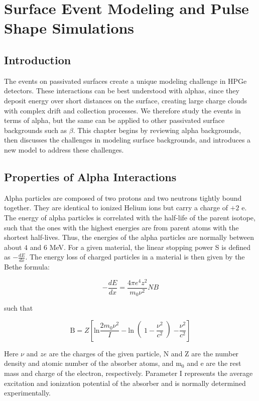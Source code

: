 \chapter{Surface Event Modeling and Pulse Shape Simulations}

\section{Introduction}

The events on passivated surfaces create a unique modeling challenge in HPGe detectors. These interactions can be best understood with alphas, since they deposit energy over short distances on the surface, creating large charge clouds with complex drift and collection processes. We therefore study the events in terms of alpha, but the same can be applied to other passivated surface backgrounds such as $\beta$. This chapter begins by reviewing alpha backgrounds, then discusses the challenges in modeling surface backgrounds, and introduces a new model to address these challenges.


\section{Properties of Alpha Interactions}
Alpha particles are composed of two protons and two neutrons tightly bound together. They are identical to ionized Helium ions but carry a charge of $+2$ e. The energy of alpha particles is correlated with the half-life of the parent isotope, such that the ones with the highest energies are from parent atoms with the shortest half-lives. Thus, the energies of the alpha particles are normally between about $4$ and $6$ MeV. For a given material, the linear stopping power S is defined as $-\frac{dE}{dx}$. The energy loss of charged particles in a material is then given by the Bethe formula:

\begin{equation}\label{bethe_formula}
    -\frac{dE}{dx} = \frac{4\pi e^4z^2}{m_0\nu^2}NB
\end{equation}

such that

\begin{equation}\label{bethe_B}
    \text{B}=Z\left[ \text{ln}\frac{2m_0\nu^2}{I}-\text{ln}\right(1-\frac{\nu^2}{c^2}\left)-\frac{\nu^2}{c^2}\right]
\end{equation}

Here $\nu$ and $ze$ are the charges of the given particle, N and Z are the number density and atomic number of the absorber atoms, and m$_0$ and e are the rest mass and charge of the electron, respectively. Parameter I represents the average excitation and ionization potential of the absorber and is normally determined experimentally. 

